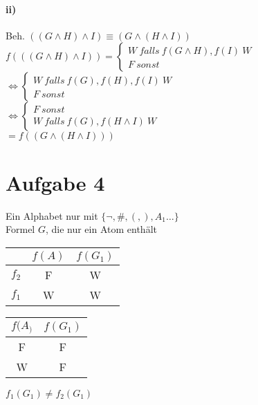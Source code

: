 \documentclass[a4paper]{scrartcl}
\begin{document}
\paragraph*{ii)}
Beh. $(( G \wedge H) \wedge I) \equiv (G \wedge ( H \wedge I))$\\
$f ((( G \wedge H) \wedge I)) = \begin{cases} W\ falls\ f(G \wedge H), f(I)\ W \\ F\ sonst \end{cases}$\\
$\Leftrightarrow \begin{cases} W\ falls\ f(G), f(H), f(I)\ W \\ F\ sonst \end{cases}$\\
$\Leftrightarrow \begin{cases} F\ sonst \\ W\ falls\ f(G), f(H \wedge I)\ W \end{cases}$\\
$= f((G \wedge (H \wedge I)))$

\newpage
\section*{Aufgabe 4}

Ein Alphabet nur mit $\{\neg, \#, (, ), A_1 … \}$\\
Formel $G$, die nur ein Atom enthält\\
\begin{tabular}{cc|c}
 & $f(A)$ & $f(G_1)$\\
 \hline
$f_2$ & F & W \\
$f_1$ & W & W \\
\end{tabular}

\begin{tabular}{c|c}
$f(A_)$ & $f(G_1)$\\
\hline
F & F \\
W & F \\
\end{tabular}

$f_1(G_1) \neq f_2(G_1)$\\
\end{document}
